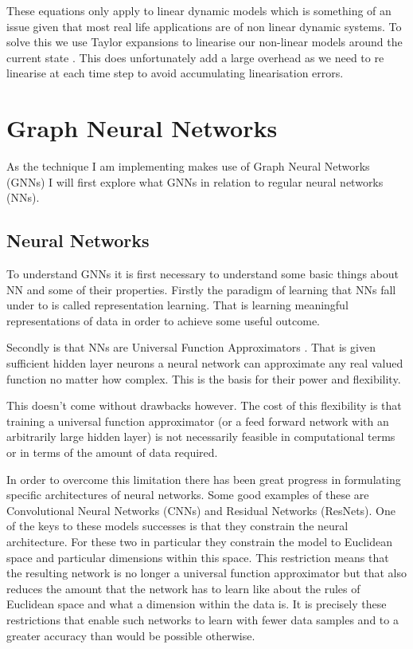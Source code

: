 \documentclass[]{../resources/final_report}
\begin{document}
These equations only apply to linear dynamic models which is something of an issue given that most 
real life applications are of non linear dynamic systems. To solve this we use Taylor expansions to 
linearise our non-linear models around the current state \cite{ExtendedKalmanNasa}. This does 
unfortunately add a large overhead as we need to re linearise at each time step to avoid 
accumulating linearisation errors.

\section{Graph Neural Networks}

As the technique I am implementing makes use of Graph Neural Networks (GNNs) I will first explore
what GNNs in relation to regular neural networks (NNs).

\subsection{Neural Networks}
To understand GNNs it is first necessary to understand some basic things about NN and some of 
their properties. Firstly the paradigm of learning that NNs fall under to is called representation learning. That is learning
meaningful representations of data in order to achieve some useful outcome.

Secondly is that NNs are Universal Function Approximators \cite{Hornik}.
That is given sufficient hidden layer neurons a neural network can approximate any real valued function 
no matter how complex. This is the basis for their power and flexibility.

This doesn't come without drawbacks however. The cost of this flexibility is that 
training a universal function approximator (or a feed forward network with an arbitrarily 
large hidden layer) is not necessarily feasible in computational terms or in terms of 
the amount of data required. 

In order to overcome this limitation there has been great progress in 
formulating specific architectures of neural networks. Some good examples of these 
are Convolutional Neural Networks (CNNs) and Residual Networks (ResNets). 
One of the keys to these models successes is that they constrain the neural architecture.
For these two in particular they constrain the model to Euclidean space and 
particular dimensions within this space. This restriction means that 
the resulting network is no longer a universal function approximator but that 
also reduces the amount that the network has to learn like about the rules of Euclidean space and what
a dimension within the data is. It is precisely these restrictions that 
enable such networks to learn with fewer data samples and to a greater accuracy
than would be possible otherwise.
\end{document}
